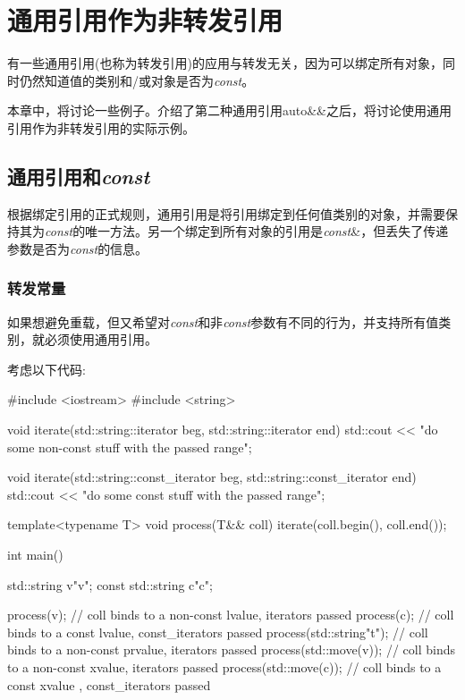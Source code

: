 \section{通用引用作为非转发引用}
有一些通用引用(也称为转发引用)的应用与转发无关，因为可以绑定所有对象，同时仍然知道值的类别和/或对象是否为\textit{const}。

本章中，将讨论一些例子。介绍了第二种通用引用auto\&\&之后，将讨论使用通用引用作为非转发引用的实际示例。

\subsection{通用引用和\textit{const}}

根据绑定引用的正式规则，通用引用是将引用绑定到任何值类别的对象，并需要保持其为\textit{const}的唯一方法。另一个绑定到所有对象的引用是\textit{const}\&，但丢失了传递参数是否为\textit{const}的信息。

\subsubsection{转发常量}

如果想避免重载，但又希望对\textit{const}和非\textit{const}参数有不同的行为，并支持所有值类别，就必须使用通用引用。

考虑以下代码:

\begin{cppcode}
#include <iostream>
#include <string>

void iterate(std::string::iterator beg, std::string::iterator end)
{
	std::cout << "do some non-const stuff with the passed range\n";
}

void iterate(std::string::const_iterator beg, std::string::const_iterator end)
{
	std::cout << "do some const stuff with the passed range\n";
}

template<typename T>
void process(T&& coll)
{
	iterate(coll.begin(), coll.end());
}

int main()
{
	std::string v{"v"};
	const std::string c{"c"};

	process(v); // coll binds to a non-const lvalue, iterators passed
	process(c); // coll binds to a const lvalue, const_iterators passed
	process(std::string{"t"}); // coll binds to a non-const prvalue, iterators passed
	process(std::move(v)); // coll binds to a non-const xvalue, iterators passed
	process(std::move(c)); // coll binds to a const xvalue , const_iterators passed
}
\end{cppcode}

